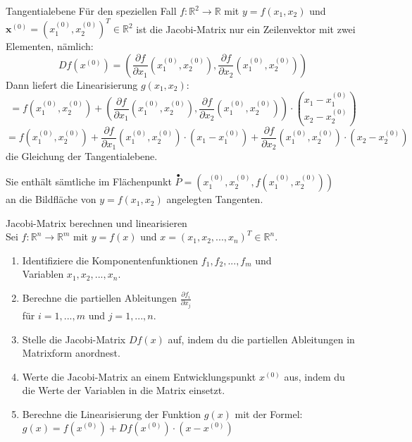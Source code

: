 \begin{corollary}{Tangentialebene}
    Für den speziellen Fall $f: \mathbb{R}^2 \longrightarrow \mathbb{R}$ mit $y=f(x_1, x_2)$ und $\boldsymbol{x}^{(0)}=(x_1^{(0)}, x_2^{(0)})^T \in \mathbb{R}^2$ 
    ist die Jacobi-Matrix nur ein Zeilenvektor mit zwei Elementen, nämlich:
    $$Df(x^{(0)}) = \left(\frac{\partial f}{\partial x_1}(x_1^{(0)}, x_2^{(0)}), \frac{\partial f}{\partial x_2}(x_1^{(0)}, x_2^{(0)})\right)$$
    Dann liefert die Linearisierung $g(x_1, x_2)$:\\ 
    $$=f(x_1^{(0)}, x_2^{(0)}) + \left(\frac{\partial f}{\partial x_1}(x_1^{(0)}, x_2^{(0)}), \frac{\partial f}{\partial x_2}(x_1^{(0)}, x_2^{(0)})\right) \cdot \binom{x_1 - x_1^{(0)}}{x_2 - x_2^{(0)}}$$
    $$= f(x_1^{(0)}, x_2^{(0)}) + \frac{\partial f}{\partial x_1}(x_1^{(0)}, x_2^{(0)}) \cdot (x_1 - x_1^{(0)}) + \frac{\partial f}{\partial x_2}(x_1^{(0)}, x_2^{(0)}) \cdot (x_2 - x_2^{(0)})$$
    die Gleichung der Tangentialebene.

    Sie enthält sämtliche im Flächenpunkt 
    $\stackrel{\bullet}{P}=\left(x_1^{(0)}, x_2^{(0)}, f(x_1^{(0)}, x_2^{(0)})\right)$ \\
    an die Bildfläche von $y=f(x_1, x_2)$ angelegten Tangenten.
\end{corollary}

\begin{KR}{Jacobi-Matrix berechnen und linearisieren}\\
Sei $f: \mathbb{R}^n \rightarrow \mathbb{R}^m$ mit $y = f(x)$ und $x = (x_1, x_2, ..., x_n)^T \in \mathbb{R}^n$. 
\vspace{-2mm}\\
\begin{enumerate}
    \item Identifiziere die Komponentenfunktionen $f_1, f_2, ..., f_m$ und \\ Variablen $x_1, x_2, ..., x_n$.
    \item Berechne die partiellen Ableitungen $\frac{\partial f_i}{\partial x_j}$ \\ für $i = 1, ..., m$ und $j = 1, ..., n$.
    \item Stelle die Jacobi-Matrix $Df(x)$ auf, indem du die partiellen Ableitungen in Matrixform anordnest.
    \item Werte die Jacobi-Matrix an einem Entwicklungspunkt $x^{(0)}$ aus, indem du die Werte der Variablen in die Matrix einsetzt.
    \item Berechne die Linearisierung der Funktion $g(x)$ mit der Formel: \\ $g(x) = f(x^{(0)}) + Df(x^{(0)}) \cdot (x - x^{(0)})$
\end{enumerate}
\end{KR}

